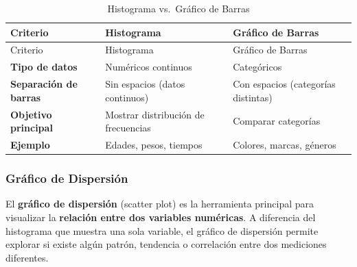 \documentclass[
  spanish,
  letterpaper,
  DIV=11,
  numbers=noendperiod]{scrreprt}
\begin{document}
\begin{longtable}[]{@{}
  >{\raggedright\arraybackslash}p{}
  >{\raggedright\arraybackslash}p{}
  >{\raggedright\arraybackslash}p{}@{}}
\caption{Histograma vs.~Gráfico de
Barras}\label{tbl-histograma-vs-barras}\tabularnewline
\toprule\noalign{}
\begin{minipage}[b]{\linewidth}\raggedright
Criterio
\end{minipage} & \begin{minipage}[b]{\linewidth}\raggedright
Histograma
\end{minipage} & \begin{minipage}[b]{\linewidth}\raggedright
Gráfico de Barras
\end{minipage} \\
\midrule\noalign{}
\endfirsthead
\toprule\noalign{}
\begin{minipage}[b]{\linewidth}\raggedright
Criterio
\end{minipage} & \begin{minipage}[b]{\linewidth}\raggedright
Histograma
\end{minipage} & \begin{minipage}[b]{\linewidth}\raggedright
Gráfico de Barras
\end{minipage} \\
\midrule\noalign{}
\endhead
\bottomrule\noalign{}
\endlastfoot
\textbf{Tipo de datos} & Numéricos continuos & Categóricos \\
\textbf{Separación de barras} & Sin espacios (datos continuos) & Con
espacios (categorías distintas) \\
\textbf{Objetivo principal} & Mostrar distribución de frecuencias &
Comparar categorías \\
\textbf{Ejemplo} & Edades, pesos, tiempos & Colores, marcas, géneros \\
\end{longtable}

\subsubsection{Gráfico de Dispersión}\label{gruxe1fico-de-dispersiuxf3n}

El \textbf{gráfico de dispersión} (scatter plot) es la herramienta
principal para visualizar la \textbf{relación entre dos variables
numéricas}. A diferencia del histograma que muestra una sola variable,
el gráfico de dispersión permite explorar si existe algún patrón,
tendencia o correlación entre dos mediciones diferentes.
\end{document}
